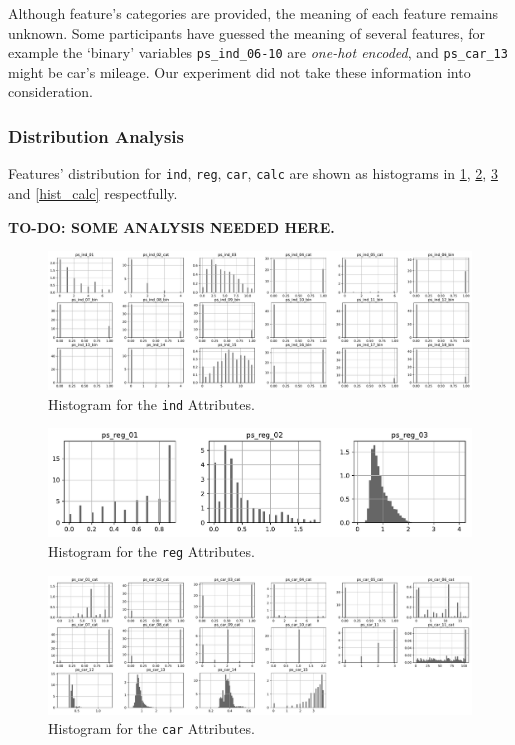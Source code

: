 \documentclass{standalone}
\begin{document}
Although feature's categories are provided, the meaning of each feature remains unknown. Some participants have guessed the meaning of several features, for example the `binary' variables  \lstinline{ps_ind_06-10} are \emph{one-hot encoded}, and \lstinline{ps_car_13} might be car's mileage.
Our experiment did not take these information into consideration.

\subsubsection{Distribution Analysis}

Features' distribution for \lstinline{ind}, \lstinline{reg}, \lstinline{car}, \lstinline{calc} are shown as histograms in \cref{hist_ind}, \cref{hist_reg}, \cref{hist_car} and \cref{hist_calc} respectfully.

\textbf{TO-DO: SOME ANALYSIS NEEDED HERE.}

\begin{figure}[!ht]
\centering
\includegraphics[width=\textwidth]{fig/ind_col.pdf}
\caption{Histogram for the \lstinline{ind} Attributes.}
\label{hist_ind}
\end{figure}

\begin{figure}[!ht]
\centering
\includegraphics[width=.5\textwidth]{fig/reg_col.pdf}
\caption{Histogram for the \lstinline{reg} Attributes.}
\label{hist_reg}
\end{figure}

\begin{figure}[!ht]
\centering
\includegraphics[width=\textwidth]{fig/car_col.pdf}
\caption{Histogram for the \lstinline{car} Attributes.}
\label{hist_car}
\end{figure}
\end{document}
